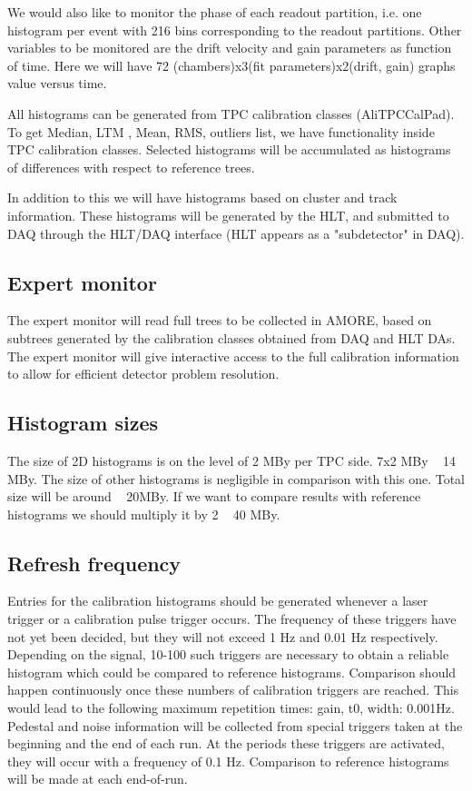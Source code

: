 \documentclass[a4paper,12pt]{article}
\begin{document}
We would also like to monitor the phase of each readout partition, i.e. one 
histogram per event with 216 bins corresponding to the readout partitions. 
Other variables to be monitored are the drift velocity and gain parameters as 
function of time. Here we will have 
72 (chambers)x3(fit parameters)x2(drift, gain) graphs value versus time.  

All histograms can be generated from TPC calibration classes (AliTPCCalPad).
To get Median, LTM , Mean, RMS, outliers list, we have functionality inside TPC 
calibration classes. Selected histograms will be accumulated as histograms of 
differences with respect to reference trees.

In addition to this we will have histograms based on cluster and track 
information. These histograms will be generated by the HLT, and submitted to 
DAQ through the HLT/DAQ interface (HLT appears as a "subdetector" in DAQ).
 
\subsection{Expert monitor}
The expert monitor will read full trees to be collected in AMORE, based on 
subtrees generated by the calibration classes obtained from DAQ and HLT DAs. 
The expert monitor will give interactive access to the full calibration 
information to allow for efficient detector problem resolution.

\subsection{Histogram sizes}
The size of 2D histograms is on the level of 2 MBy per TPC side. 7x2 MBy ~ 14 MBy.
The size of other histograms is negligible in comparison with this one. Total 
size will be around ~ 20MBy. If we want to compare results with reference 
histograms we should multiply it by 2 ~ 40 MBy.
  
\subsection{Refresh frequency}
Entries for the calibration histograms should be generated whenever a laser 
trigger or a calibration pulse trigger occurs. The frequency of these triggers 
have not yet been decided, but they will not exceed 1 Hz and 0.01 Hz 
respectively. Depending on the signal, 10-100 such triggers are necessary to 
obtain a reliable histogram which could be compared to reference histograms. 
Comparison should happen continuously once these numbers of calibration 
triggers are reached. This would lead to the following maximum repetition 
times: gain, t0, width:   0.001Hz. 
Pedestal and noise information will be collected from special triggers taken at 
the beginning and the end of each run. At the periods these triggers are 
activated, they will occur with a frequency of 0.1 Hz.
Comparison to reference histograms will be made at each end-of-run.
\end{document}
